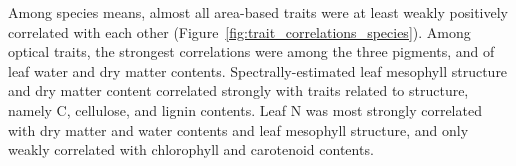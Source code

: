 Among species means, almost all area-based traits were at least weakly positively correlated with each other (Figure~\ref{fig:trait_correlations_species}).
Among optical traits, the strongest correlations were among the three pigments, and of leaf water and dry matter contents.
Spectrally-estimated leaf mesophyll structure and dry matter content correlated strongly with traits related to structure, namely C, cellulose, and lignin contents.
Leaf N was most strongly correlated with dry matter and water contents and leaf mesophyll structure, and only weakly correlated with chlorophyll and carotenoid contents.
